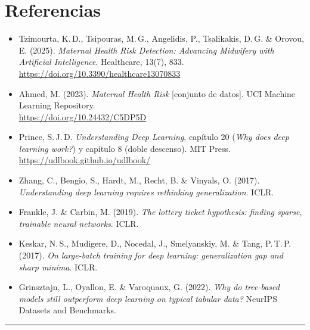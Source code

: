\documentclass[11pt, a4paper]{article}
\begin{document}
\section{Referencias}

\begin{itemize}
	\item Tzimourta, K.\,D., Tsipouras, M.\,G., Angelidis, P., Tsalikakis, D.\,G. \& Orovou, E. (2025). \emph{Maternal Health Risk Detection: Advancing Midwifery with Artificial Intelligence}. Healthcare, 13(7), 833.\\ \url{https://doi.org/10.3390/healthcare13070833}
	\item Ahmed, M. (2023). \emph{Maternal Health Risk} [conjunto de datos]. UCI Machine Learning Repository.\\ \url{https://doi.org/10.24432/C5DP5D}
	\item Prince, S.\,J.\,D. \emph{Understanding Deep Learning}, cap\'itulo 20 (\emph{Why does deep learning work?}) y cap\'itulo 8 (doble descenso). MIT Press.\\ \url{https://udlbook.github.io/udlbook/}
	\item Zhang, C., Bengio, S., Hardt, M., Recht, B. \& Vinyals, O. (2017). \emph{Understanding deep learning requires rethinking generalization}. ICLR.
	\item Frankle, J. \& Carbin, M. (2019). \emph{The lottery ticket hypothesis: finding sparse, trainable neural networks}. ICLR.
	\item Keskar, N.\,S., Mudigere, D., Nocedal, J., Smelyanskiy, M. \& Tang, P.\,T.\,P. (2017). \emph{On large-batch training for deep learning: generalization gap and sharp minima}. ICLR.
	\item Grinsztajn, L., Oyallon, E. \& Varoquaux, G. (2022). \emph{Why do tree-based models still outperform deep learning on typical tabular data?} NeurIPS Datasets and Benchmarks.
\end{itemize}

\vspace{1em}
\hrule
\vspace{0.4em}
\end{document}
